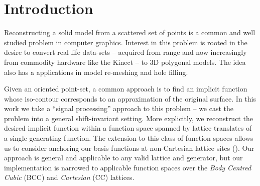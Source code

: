 \section{Introduction}

\label{sec:intro}
Reconstructing a solid model from a scattered set of points is a common and well studied problem in computer graphics. Interest in this problem is rooted in the desire to convert real life data-sets -- acquired from range and now increasingly from commodity hardware like the Kinect -- to 3D polygonal models. The idea also has a applications in model re-meshing and hole filling. 

Given an oriented point-set, a common approach is to find an implicit function whose iso-contour corresponds to an approximation of the original surface. In this work we take a ``signal processing'' approach to this problem -- we cast the problem into a general shift-invariant setting. More explicitly, we reconstruct the desired implicit function within a function space spanned by lattice translates of a single generating function. The extension to this class of function spaces allows us to consider anchoring our basis functions at non-Cartesian lattice sites (). Our approach is general and applicable to any valid lattice and generator, but our implementation is narrowed to applicable function spaces over the \emph{Body Centred Cubic} (BCC) and \emph{Cartesian} (CC) lattices.

